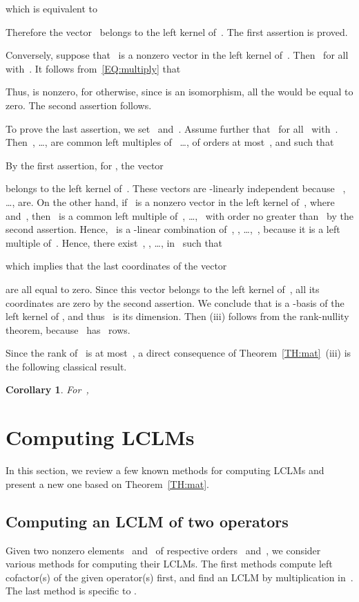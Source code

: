 \documentclass{sig-alt-full}
\def\foorp{\hfill}
\newtheorem{cor}[theorem]{Corollary}
\begin{document}
which is equivalent to

Therefore the vector~ belongs to the left kernel of~.
The first assertion is proved.

Conversely, suppose that~ is a nonzero vector in the left kernel of~.
Then~ for all~ with~.
It follows from~\eqref{EQ:multiply} that

Thus,  is nonzero, for otherwise, since  is an isomorphism, all the  would be equal to zero.
The second assertion follows.

To prove the last assertion, we set~ and~.
Assume further that~ for all~ with~.
Then~, \ldots,  are common left  multiples of~ \ldots,  of orders at most~, and such that

By the first assertion, for , the vector

belongs to the left kernel of~. These vectors are -linearly independent because~ , \ldots, 
are. 
On the other hand, if~ is a nonzero vector in the left kernel of~,
where~ and~, then~ is
a common left multiple of~, \ldots,~ with order no greater than~ by the second assertion.
Hence,~ is a -linear combination of~, , \ldots,~,
because it is a left multiple of~.
Hence, there exist~, , \ldots,  in~ such
that

which implies that the last  coordinates of the vector

are all equal to zero. Since this vector belongs to
the left kernel of~, all its coordinates are zero by the second assertion.
We conclude that  is a -basis of the left kernel of , and thus~ is its dimension. Then (iii) follows from the rank-nullity theorem, because~
has~ rows.
\foorp

\medskip
Since the rank of~ is at most~, a direct consequence of Theorem~\ref{TH:mat}~(iii) is the following classical result.
\begin{cor} \label{COR:bounds} 
For~,

\end{cor}



\section{Computing LCLMs} \label{SECT:comp}
In this section, we review a few known methods for computing LCLMs and present a new one based on
Theorem~\ref{TH:mat}.

\subsection{Computing an LCLM of two operators} \label{SUBSECT:comp2}
Given two nonzero elements~ and~ of respective orders~ and~, we consider various methods for computing their LCLMs.
The first methods  compute left cofactor(s) of
the given operator(s) first, and find an LCLM by multiplication in~. The last method is specific to .
\end{document}
